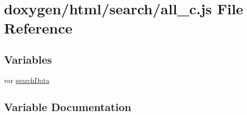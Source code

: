 \hypertarget{a00057}{}\section{doxygen/html/search/all\+\_\+c.js File Reference}
\label{a00057}
\subsection*{Variables}
\begin{DoxyCompactItemize}
\item 
var \hyperlink{a00057_ad01a7523f103d6242ef9b0451861231e}{search\+Data}
\end{DoxyCompactItemize}


\subsection{Variable Documentation}
\hypertarget{a00057_ad01a7523f103d6242ef9b0451861231e}{}
